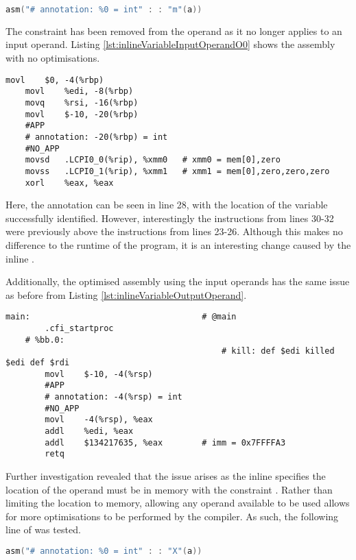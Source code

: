 \begin{lstlisting}[language=C, numbers=none]
asm("# annotation: %0 = int" : : "m"(a))
\end{lstlisting}

The  constraint has been removed from the operand as it no longer applies to an input operand. Listing \ref{lst:inlineVariableInputOperandO0} shows the assembly with no optimisations.

\begin{lstlisting}[firstnumber=23, caption=variable-O0.s, label=lst:inlineVariableInputOperandO0]
	movl	$0, -4(%rbp)
	movl	%edi, -8(%rbp)
	movq	%rsi, -16(%rbp)
	movl	$-10, -20(%rbp)
	#APP
	# annotation: -20(%rbp) = int
	#NO_APP
	movsd	.LCPI0_0(%rip), %xmm0   # xmm0 = mem[0],zero
	movss	.LCPI0_1(%rip), %xmm1   # xmm1 = mem[0],zero,zero,zero
	xorl	%eax, %eax
\end{lstlisting}

Here, the annotation can be seen in line 28, with the location of the variable successfully identified. However, interestingly the instructions from lines 30-32 were previously above the instructions from lines 23-26. Although this makes no difference to the runtime of the program, it is an interesting change caused by the inline . 

Additionally, the optimised assembly using the input operands has the same issue as before from Listing \ref{lst:inlineVariableOutputOperand}.

\begin{lstlisting}[firstnumber=6, caption=variable-O3.s]
    main:                                   # @main
        .cfi_startproc
    # %bb.0:
                                            # kill: def $edi killed $edi def $rdi
        movl	$-10, -4(%rsp)
        #APP
        # annotation: -4(%rsp) = int
        #NO_APP
        movl	-4(%rsp), %eax
        addl	%edi, %eax
        addl	$134217635, %eax        # imm = 0x7FFFFA3
        retq
\end{lstlisting}

Further investigation revealed that the issue arises as the inline  specifies the location of the operand must be in memory with the constraint . Rather than limiting the location to memory, allowing any operand available to be used allows for more optimisations to be performed by the compiler. As such, the following line of  was tested. 

\begin{lstlisting}[language=C, numbers=none]
asm("# annotation: %0 = int" : : "X"(a))
\end{lstlisting}


